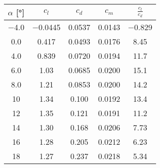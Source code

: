 \begin{tabular}{ccccc}
\toprule
$\alpha$ [\unit{\degree}] & $c_l$ & $c_d$ & $c_m$ & $\frac{c_l}{c_d}$ \\
\midrule
\num{-4.0} & \num{-0.0445} & \num{0.0537} & \num{0.0143} & \num{-0.829} \\ 
\num{0.0} & \num{0.417} & \num{0.0493} & \num{0.0176} & \num{8.45} \\ 
\num{4.0} & \num{0.839} & \num{0.0720} & \num{0.0194} & \num{11.7} \\ 
\num{6.0} & \num{1.03} & \num{0.0685} & \num{0.0200} & \num{15.1} \\ 
\num{8.0} & \num{1.21} & \num{0.0853} & \num{0.0200} & \num{14.2} \\ 
\num{10} & \num{1.34} & \num{0.100} & \num{0.0192} & \num{13.4} \\ 
\num{12} & \num{1.35} & \num{0.121} & \num{0.0191} & \num{11.2} \\ 
\num{14} & \num{1.30} & \num{0.168} & \num{0.0206} & \num{7.73} \\ 
\num{16} & \num{1.28} & \num{0.205} & \num{0.0212} & \num{6.23} \\ 
\num{18} & \num{1.27} & \num{0.237} & \num{0.0218} & \num{5.34} \\ 
\bottomrule
\end{tabular}